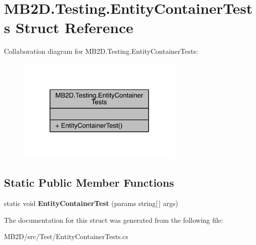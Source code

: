 \hypertarget{struct_m_b2_d_1_1_testing_1_1_entity_container_tests}{}\section{M\+B2\+D.\+Testing.\+Entity\+Container\+Tests Struct Reference}
\label{struct_m_b2_d_1_1_testing_1_1_entity_container_tests}


Collaboration diagram for M\+B2\+D.\+Testing.\+Entity\+Container\+Tests\+:
\nopagebreak
\begin{figure}[H]
\begin{center}
\leavevmode
\includegraphics[width=229pt]{struct_m_b2_d_1_1_testing_1_1_entity_container_tests__coll__graph}
\end{center}
\end{figure}
\subsection*{Static Public Member Functions}
\begin{DoxyCompactItemize}
\item 
\hypertarget{struct_m_b2_d_1_1_testing_1_1_entity_container_tests_a745b6bc43f1feb392b1e835ee86acac0}{}\label{struct_m_b2_d_1_1_testing_1_1_entity_container_tests_a745b6bc43f1feb392b1e835ee86acac0} 
static void {\bfseries Entity\+Container\+Test} (params string\mbox{[}$\,$\mbox{]} args)
\end{DoxyCompactItemize}


The documentation for this struct was generated from the following file\+:\begin{DoxyCompactItemize}
\item 
M\+B2\+D/src/\+Test/Entity\+Container\+Tests.\+cs\end{DoxyCompactItemize}
